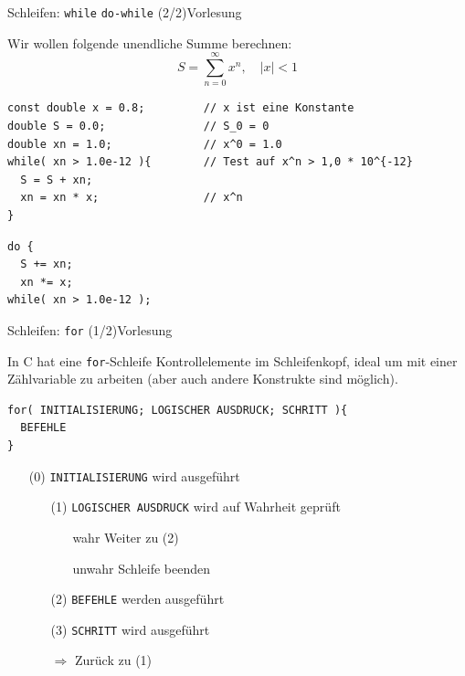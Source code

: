 \documentclass[xcolor=dvipsnames]{beamer}
\newcounter{lecturecounter}
\begin{document}
\begin{frame}[fragile]{Schleifen: \texttt{while} \texttt{do-while} (2/2)}{Vorlesung }
\begin{block}{}
Wir wollen folgende unendliche Summe berechnen:
\begin{equation*}
  S=\sum_{n=0}^\infty x^n, \quad |x| < 1
\end{equation*}
\end{block}

\begin{lstlisting}
const double x = 0.8;         // x ist eine Konstante
double S = 0.0;               // S_0 = 0
double xn = 1.0;              // x^0 = 1.0
while( xn > 1.0e-12 ){        // Test auf x^n > 1,0 * 10^{-12}
  S = S + xn;
  xn = xn * x;                // x^n
}
\end{lstlisting}
\begin{lstlisting}
do {
  S += xn;
  xn *= x;
while( xn > 1.0e-12 );
\end{lstlisting}

\end{frame}

\begin{frame}[fragile]{Schleifen: \texttt{for} (1/2)}{Vorlesung }
\begin{block}{}
  In C hat eine \texttt{for}-Schleife Kontrollelemente im Schleifenkopf, ideal um mit einer Zählvariable zu arbeiten (aber auch andere Konstrukte sind möglich).
\end{block}
\begin{lstlisting}
for( INITIALISIERUNG; LOGISCHER AUSDRUCK; SCHRITT ){
  BEFEHLE
}
\end{lstlisting}
\begin{enumerate}
  \item[(0)]{\texttt{INITIALISIERUNG} wird ausgeführt}
  \begin{enumerate}
    \item[(1)]{\texttt{LOGISCHER AUSDRUCK} wird auf Wahrheit geprüft}
    \begin{enumerate}
      \item[wahr]{Weiter zu (2)}
      \item[unwahr]{Schleife beenden}
    \end{enumerate}
    \item[(2)]{\texttt{BEFEHLE} werden ausgeführt}
    \item[(3)]{\texttt{SCHRITT} wird ausgeführt}
    \item[$\Rightarrow$]{Zurück zu (1)}
  \end{enumerate}
\end{enumerate}
\end{frame}
\end{document}
